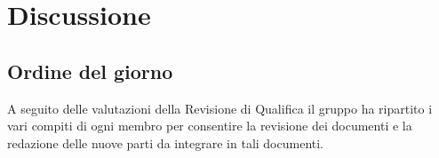 \section{Discussione} {
	\subsection{Ordine del giorno} {
	A seguito delle valutazioni della Revisione di Qualifica il gruppo ha ripartito i vari compiti di ogni membro per consentire la revisione dei documenti e la redazione delle nuove parti da integrare in tali documenti.
}
}